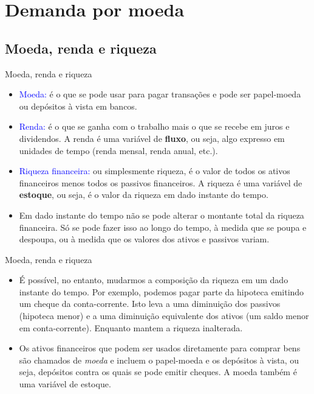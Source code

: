 \documentclass[10pt]{beamer}
\begin{document}
\section{Demanda por moeda}
\subsection{Moeda, renda e riqueza}
\begin{frame}{Moeda, renda e riqueza}
    \begin{itemize}
        \item \textcolor{blue}{Moeda:} é o que se pode usar para pagar transações e pode ser papel-moeda ou depósitos à vista em bancos.
        \bigskip
        \item \textcolor{blue}{Renda:} é o que se ganha com o trabalho mais o que se recebe em juros e dividendos. A renda é uma variável de \textbf{fluxo}, ou seja, algo expresso em unidades de tempo (renda mensal, renda anual, etc.).
        \bigskip
        \item \textcolor{blue}{Riqueza financeira:} ou simplesmente riqueza, é o valor de todos os ativos financeiros menos todos os passivos financeiros. A riqueza é uma variável de \textbf{estoque}, ou seja, é o valor da riqueza em dado instante do tempo.
        \bigskip
        \item Em dado instante do tempo não se pode alterar o montante total da riqueza financeira. Só se pode fazer isso ao longo do tempo, à medida que se poupa e despoupa, ou à medida que os valores dos ativos e passivos variam.
    \end{itemize}
\end{frame}

\begin{frame}{Moeda, renda e riqueza}
\begin{itemize}
    \item É possível, no entanto, mudarmos a composição da riqueza em um dado instante do tempo. Por exemplo, podemos pagar parte da hipoteca emitindo um cheque da conta-corrente. Isto leva a uma diminuição dos passivos (hipoteca menor) e a uma diminuição equivalente dos ativos (um saldo menor em conta-corrente). Enquanto mantem a riqueza inalterada.
    \bigskip
    \item Os ativos financeiros que podem ser usados diretamente para comprar bens são chamados de \emph{moeda} e incluem o papel-moeda e os depósitos à vista, ou seja, depósitos contra os quais se pode emitir cheques. A moeda também é uma variável de estoque.
\end{itemize}
\end{frame}
\end{document}
